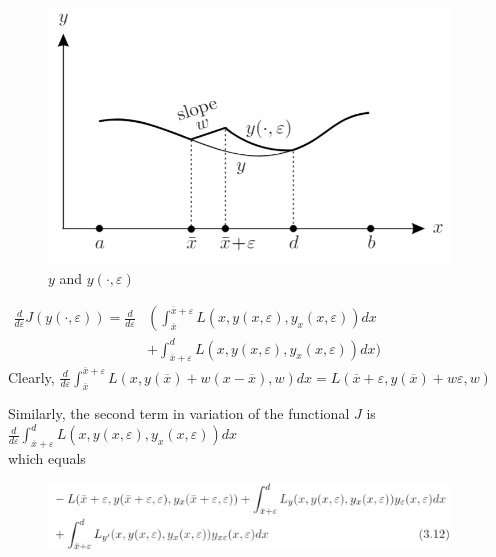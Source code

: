 \documentclass{beamer}
\begin{document}
    \begin{frame}
        \begin{figure}[!htb]
	\centering
	\includegraphics[width=0.95\textwidth]{ch3/Wexcess2.png}
	\caption{$y$ and $y(\cdot, \varepsilon)$}
    \end{figure}
    \end{frame}
    \begin{frame}
        $\begin{aligned} \frac { d } { d \varepsilon } J ( y ( \cdot , \varepsilon ) ) = \frac { d } { d \varepsilon } & \left( \int _ { \overline { x } } ^ { \overline { x } + \varepsilon } L \left( x , y ( x , \varepsilon ) , y _ { x } ( x , \varepsilon ) \right) d x \right.\\ & + \int _ { \overline { x } + \varepsilon } ^ { d } L \left( x , y ( x , \varepsilon ) , y _ { x } ( x , \varepsilon ) \right) d x ) \end{aligned}$
        \\
        Clearly,
        $ \frac{d}{d\varepsilon} \int _ { \overline { x } } ^ { \overline { x } + \varepsilon } L ( x , y ( \overline { x } ) + w ( x - \overline { x } ) , w ) d x = L ( \overline { x } + \varepsilon , y ( \overline { x } ) + w \varepsilon , w )$
    \end{frame}
    \begin{frame}
        Similarly, the second term in variation of the functional $J$ is
        $ \frac{d}{d\varepsilon}
        \int _ { \overline { x } + \varepsilon } ^ { d } L \left( x , y ( x , \varepsilon ) , y _ { x } ( x , \varepsilon ) \right) d x
        $\\
        which equals\\
        \begin{figure}[!htb]
	\centering
	\includegraphics[width=0.95\textwidth]{ch3/Eq312.png}
    \end{figure}
    \end{frame}
\end{document}
